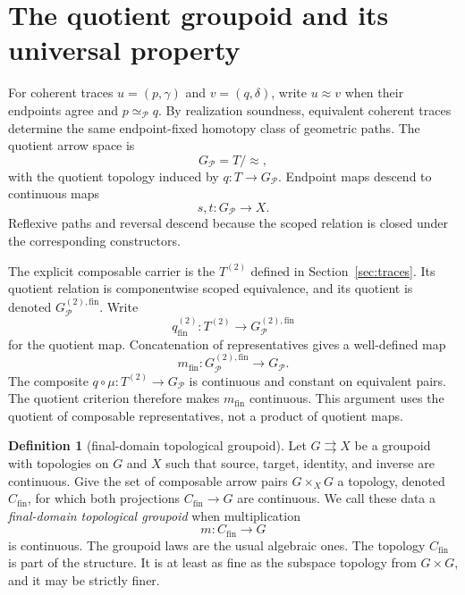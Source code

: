 \documentclass[10pt,reqno]{amsart}
\theoremstyle{definition}
\newtheorem{definition}{Definition}[section]
\theoremstyle{plain}
\theoremstyle{remark}
\newcommand{\RwEq}{\mathrel{\simeq_{\!\mathcal P}}}
\newcommand{\Fin}{\mathrm{fin}}
\newcommand{\FigureAltText}[1]{\par\smallskip{\small\textbf{Alt text:} #1\par}}
\newcommand{\MainFigure}[2]{%
  \begingroup\let\SavedFigureCaption\caption
  \renewcommand{\caption}[1]{\SavedFigureCaption{##1}\FigureAltText{#2}}%
  \endgroup}
\begin{document}
\MainFigure{backtracking}{The triangular parameter for an out-and-back path is capped at decreasing heights, ending at the constant path while endpoints stay fixed.}

\section{The quotient groupoid and its universal property}
\label{sec:quotient}

For coherent traces $u=(p,\gamma)$ and $v=(q,\delta)$, write
$u\approx v$ when their endpoints agree and $p\RwEq q$.  By realization
soundness, equivalent coherent traces determine the same endpoint-fixed
homotopy class of geometric paths.  The quotient arrow space is
\[
  G_{\mathcal P}=T/{\approx},
\]
with the quotient topology induced by $q:T\to G_{\mathcal P}$.  Endpoint
maps descend to continuous maps
\[
  s,t:G_{\mathcal P}\longrightarrow X.
\]
Reflexive paths and reversal descend because the scoped relation is closed
under the corresponding constructors.

The explicit composable carrier is the $T^{(2)}$ defined in Section~\ref{sec:traces}.
Its quotient relation is componentwise scoped equivalence, and its quotient is
denoted $G_{\mathcal P}^{(2),\Fin}$.  Write
\[
  q_{\Fin}^{(2)}:T^{(2)}\longrightarrow G_{\mathcal P}^{(2),\Fin}
\]
for the quotient map.  Concatenation of representatives gives a well-defined
map
\[
  m_{\Fin}:G_{\mathcal P}^{(2),\Fin}\longrightarrow G_{\mathcal P}.
\]
The composite $q\circ\mu:T^{(2)}\to G_{\mathcal P}$ is continuous and
constant on equivalent pairs.  The quotient criterion therefore makes
$m_{\Fin}$ continuous.  This argument uses the quotient of composable
representatives, not a product of quotient maps.

\begin{definition}[final-domain topological groupoid]
Let $G\rightrightarrows X$ be a groupoid with topologies on $G$ and $X$
such that source, target, identity, and inverse are continuous.
Give the set of composable arrow pairs $G\times_XG$ a topology, denoted
$C_{\mathrm{fin}}$, for which both projections $C_{\mathrm{fin}}\to G$ are
continuous.  We call these data a
\emph{final-domain topological groupoid} when multiplication
\[
  m:C_{\mathrm{fin}}\longrightarrow G
\]
is continuous.  The groupoid laws are the usual algebraic ones.  The topology
$C_{\mathrm{fin}}$ is part of the structure.  It is at least as fine as the
subspace topology from $G\times G$, and it may be strictly finer.
\end{definition}
\end{document}
